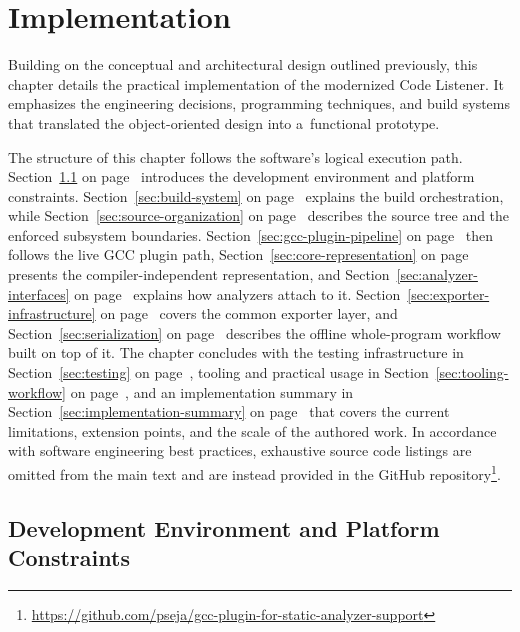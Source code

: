 \documentclass[xpsejal00-gcc-plugin.tex]{subfiles}
\begin{document}
\chapter{Implementation}\label{chap:implementation}

Building on the conceptual and architectural design outlined previously, this chapter details the practical implementation of the modernized Code Listener.
It emphasizes the engineering decisions, programming techniques, and build systems that translated the object-oriented design into a~functional prototype.

The structure of this chapter follows the software's logical execution path.
Section~\ref{sec:dev-env} on page~\pageref{sec:dev-env} introduces the development environment and platform constraints.
Section~\ref{sec:build-system} on page~\pageref{sec:build-system} explains the build orchestration, while Section~\ref{sec:source-organization} on page~\pageref{sec:source-organization} describes the source tree and the enforced subsystem boundaries.
Section~\ref{sec:gcc-plugin-pipeline} on page~\pageref{sec:gcc-plugin-pipeline} then follows the live GCC plugin path, Section~\ref{sec:core-representation} on page~\pageref{sec:core-representation} presents the compiler-independent representation, and Section~\ref{sec:analyzer-interfaces} on page~\pageref{sec:analyzer-interfaces} explains how analyzers attach to it.
Section~\ref{sec:exporter-infrastructure} on page~\pageref{sec:exporter-infrastructure} covers the common exporter layer, and Section~\ref{sec:serialization} on page~\pageref{sec:serialization} describes the offline whole-program workflow built on top of it.
The chapter concludes with the testing infrastructure in Section~\ref{sec:testing} on page~\pageref{sec:testing}, tooling and practical usage in Section~\ref{sec:tooling-workflow} on page~\pageref{sec:tooling-workflow}, and an implementation summary in Section~\ref{sec:implementation-summary} on page~\pageref{sec:implementation-summary} that covers the current limitations, extension points, and the scale of the authored work.
In accordance with software engineering best practices, exhaustive source code listings are omitted from the main text and are instead provided in the GitHub repository\footnote{\url{https://github.com/pseja/gcc-plugin-for-static-analyzer-support}}.

\section{Development Environment and Platform Constraints}\label{sec:dev-env}
\end{document}

